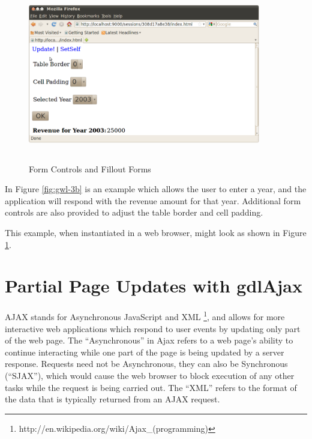 \documentclass [11pt]{book}
\begin{document}
\begin{figure}
\begin{center}
\includegraphics[width=4in,height=3in]{../images/gwl-3b.png}
\end{center}

\caption{Form Controls and Fillout Forms}

\label{fig:gwl-3b-image}

\end{figure}


In Figure 
\ref{fig:gwl-3b} is an example which allows the user to enter a year, and the 
application will respond with the revenue amount for that year. Additional
form controls are also provided to adjust the table border and cell padding.



This example, when instantiated in a web browser, might look as shown in Figure 
\ref{fig:gwl-3b-image}.



\section{Partial Page Updates with gdlAjax}

\label{sec:partialpageupdateswithgdlajax}



AJAX stands for Asynchronous JavaScript and
XML \footnote{http://en.wikipedia.org/wiki/Ajax\_(programming)}, and allows for more interactive web applications which
respond to user events by updating only part of the web page. The
``Asynchronous'' in Ajax refers to a web page's ability to continue
interacting while one part of the page is being updated by a server
response. Requests need not be Asynchronous, they can also be
Synchronous (``SJAX''), which would cause the web browser to block
execution of any other tasks while the request is being carried
out. The ``XML'' refers to the format of the data that is typically
returned from an AJAX request.
\end{document}
